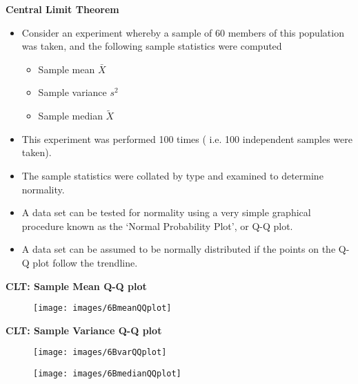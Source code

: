 \documentclass[]{report}
\begin{document}
\textbf{Central Limit Theorem}
\begin{itemize}
\item Consider an experiment whereby a sample of 60 members of this population was taken, and the following sample statistics were computed
\begin{itemize}
\item Sample mean $\bar{X}$
\item Sample variance $s^2$
\item Sample median $\tilde{X}$
\end{itemize}
\item This experiment was performed 100 times ( i.e. 100 independent samples were taken).
\item The sample statistics were collated by type and examined to determine normality.
\item A data set can be tested for normality using a very simple graphical procedure known as the `Normal Probability Plot', or Q-Q plot.
\item A data set can be assumed to be normally distributed if the points on the Q-Q plot follow the trendline.
\end{itemize}


\textbf{CLT: Sample Mean Q-Q plot}
\begin{figure}
\texttt{[image: images/6BmeanQQplot]}\\

\end{figure}



\textbf{CLT: Sample Variance Q-Q plot}
\begin{figure}
\texttt{[image: images/6BvarQQplot]}\\

\end{figure}


\begin{figure}
\texttt{[image: images/6BmedianQQplot]}\\

\end{figure}

\end{document}
